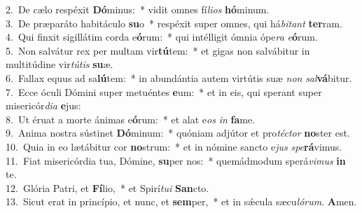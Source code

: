 {2.~}De cælo respéxit \textbf{Dó}minus:~* vidit omnes fí\textit{li}\textit{os} \textbf{hó}minum.\\
{3.~}De præparáto habitáculo \textbf{su}o~* respéxit super omnes, qui há\textit{bi}\textit{tant} \textbf{ter}ram.\\
{4.~}Qui finxit sigillátim corda e\textbf{ó}rum:~* qui intélligit ómnia ópe\textit{ra} \textit{e}\textbf{ó}rum.\\
{5.~}Non salvátur rex per multam vir\textbf{tú}tem:~* et gigas non salvábitur in multitúdine vir\textit{tú}\textit{tis} \textbf{su}æ.\\
{6.~}Fallax equus ad sa\textbf{lú}tem:~* in abundántia autem virtútis suæ \textit{non} \textit{sal}\textbf{vá}bitur.\\
{7.~}Ecce óculi Dómini super metuéntes \textbf{e}um:~* et in eis, qui sperant super misericór\textit{di}\textit{a} \textbf{e}jus:\\
{8.~}Ut éruat a morte ánimas e\textbf{ó}rum:~* et alat e\textit{os} \textit{in} \textbf{fa}me.\\
{9.~}Anima nostra sústinet \textbf{Dó}minum:~* quóniam adjútor et pro\textit{té}\textit{ctor} \textbf{no}ster est.\\
{10.~}Quia in eo lætábitur cor \textbf{no}strum:~* et in nómine sancto e\textit{jus} \textit{spe}\textbf{rá}vimus.\\
{11.~}Fiat misericórdia tua, Dómine, \textbf{su}per nos:~* quemádmodum sperá\textit{vi}\textit{mus} \textbf{in} te.\\
{12.~}Glória Patri, et \textbf{Fí}lio,~* et Spirí\textit{tu}\textit{i} \textbf{San}cto.\\
{13.~}Sicut erat in princípio, et nunc, et \textbf{sem}per,~* et in sǽcula sæcu\textit{ló}\textit{rum}. \textbf{A}men.\\
